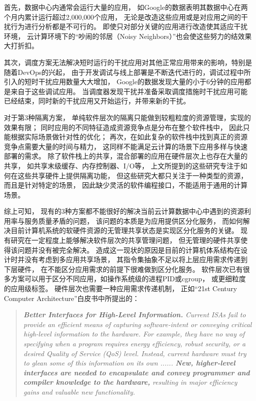 首先，数据中心内通常会运行大量的应用，
如Google的数据\cite{Reiss_googletrace_2012}表明其数据中心在两个月内累计运行超过2,000,000个应用，
无论是改造这些应用或是对应用之间的干扰行为进行分析都是不可行的。
即使只对部分关键的应用进行改造使其适应干扰环境，
云计算环境下的``吵闹的邻居（Noisy Neighbors）''也会使这些努力的结效果大打折扣。

其次，调度方案无法解决短时运行的干扰应用对其他正常应用带来的影响，特别是随着DevOps的兴起，
由于开发调试与线上部署是不断迭代进行的，调试过程中所引入的短时干扰应用数量大大增加，
Google的数据\cite{Reiss_googletrace_2012}发现大量的小于6分钟的应用都是来自于这些调试应用。
当调度器发现干扰并准备采取调度措施时干扰应用可能已经结束，同时新的干扰应用又开始运行，并带来新的干扰。

对于第3种隔离方案，
单纯软件层次的隔离只能做到较粗粒度的资源管理，实现的效果有限；
同时应用的不同特征造成资源竞争点是分布在整个软件栈中，
因此只能根据实际场景做针对性的优化；
再次，在如此复杂的软件栈中找到真正的资源竞争点需要大量的时间与精力，
这同样不能满足云计算的场景下应用多样与快速部署的需求。
除了软件栈上的共享，混合部署的应用在硬件层次上也存在大量的共享，
如共享末级缓存、内存控制器、I/O等，
上文所提到的这些研究专注于如何在这些共享硬件上提供隔离功能，
但这些研究大都只关注于一种类型的资源，而且是针对特定的场景，
因此缺少灵活的软件编程接口，不能适用于通用的计算场景。

综上可知，
现有的3种方案都不能很好的解决当前云计算数据中心中遇到的资源利用率与服务质量矛盾的问题，
该问题的本质是为应用提供区分化服务，
而如何解决目前计算机系统的软硬件资源的无管理共享状态是实现区分化服务的关键。
现有研究在一定程度上能够解决软件层次的共享管理问题，
但无管理的硬件共享使得该问题并没有被完全解决。
造成这一现状的原因是目前的计算机体系结构在设计时并没有考虑到多应用共享场景，
其指令集抽象不足以将上层应用需求传递到下层硬件，
在不能区分应用需求的前提下很难做到区分化服务。
软件层次已有很多方案可以用于区分不同应用，如操作系统级的进程PID或cgroup，
或更细粒度的应用级标签\cite{timecard:2013,d2p:2014, mesnier_differentiated_2011, thereska_ioflow:_2013}。
硬件层次也需要一种应用需求传递机制，
正如``21st Century Computer Architecture''白皮书中所提出的：

\begin{quotation} 
\emph{\textbf{Better Interfaces for High-Level Information.}
Current ISAs fail to provide an efficient means of capturing software-intent or conveying critical high-level information to the hardware.
For example, they have no way of specifying when a program requires energy efficiency, robust security, or a desired Quality of Service (QoS) level.
Instead, current hardware must try to glean some of this information on its own ......
\textbf{New, higher-level interfaces are needed to encapsulate and convey programmer and compiler knowledge to the hardware,}
resulting in major efficiency gains and valuable new functionality.}\cite{21st_architecture}
\end{quotation}

